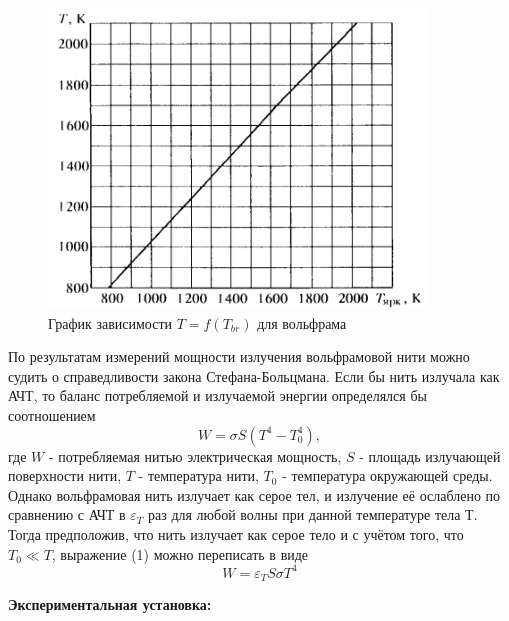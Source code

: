 \documentclass[a4paper, 12pt]{article}%
\begin{document}
	\begin{figure}[H]
		\centering
		\includegraphics[width=10cm]{fig2}
		\caption{График зависимости $T = f(T_{br})$ для вольфрама}
	\end{figure}
	
	По результатам измерений мощности излучения вольфрамовой нити можно судить о справедливости закона Стефана-Больцмана. Если бы нить излучала как АЧТ, то баланс потребляемой и излучаемой энергии определялся бы соотношением 
	\begin{equation}
		W = \sigma S (T^4 - T_0^4),
	\end{equation}
	где $W$ - потребляемая нитью электрическая мощность, $S$ - площадь излучающей поверхности нити, $T$ - температура нити, $T_0$ - температура окружающей среды. Однако вольфрамовая нить излучает как серое тел, и излучение её ослаблено по сравнению с АЧТ в $\varepsilon_T$ раз для любой волны при данной температуре тела Т. Тогда предположив, что нить излучает как серое тело и с учётом того, что $T_0 \ll T$, выражение (1) можно переписать в виде
	\begin{equation}
		W = \varepsilon_T S \sigma T^4
	\end{equation}
	
	\textbf{Экспериментальная установка: }\\
	
\end{document}
